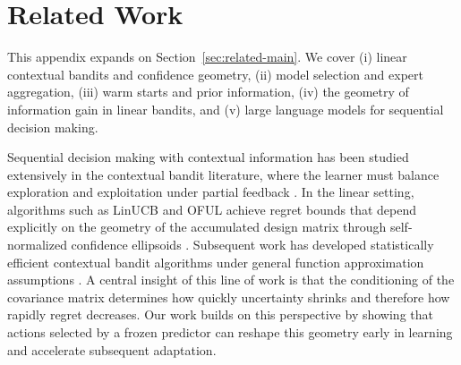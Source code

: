 \documentclass[anon]{alt2027} %
\begin{document}





\appendix

\section{Related Work}\label{sec:related}
This appendix expands on Section~\ref{sec:related-main}. We cover (i) linear contextual bandits and confidence geometry,
(ii) model selection and expert aggregation, (iii) warm starts and prior
information, (iv) the geometry of information gain in linear bandits, and
(v) large language models for sequential decision making.

Sequential decision making with contextual information has been studied
extensively in the contextual bandit literature, where the learner must
balance exploration and exploitation under partial feedback
\citep{langford2007epoch,agarwal2014taming,foster2021statistical,
lattimore2020bandit}. In the linear setting, algorithms such as LinUCB and
OFUL achieve regret bounds that depend explicitly on the geometry of the
accumulated design matrix through self-normalized confidence ellipsoids
\citep{chu2011contextual,abbasi2011improved}. Subsequent work has developed
statistically efficient contextual bandit algorithms under general function
approximation assumptions \citep{agarwal2012contextual,foster2018practical,
foster2020beyond,simchi2022bypassing,zhu2022contextual,rucker2023infinite,
zhang2024efficient}. A central insight of this line of work is that the
conditioning of the covariance matrix determines how quickly uncertainty
shrinks and therefore how rapidly regret decreases. Our work builds on this
perspective by showing that actions selected by a frozen predictor can
reshape this geometry early in learning and accelerate subsequent adaptation.
\end{document}
